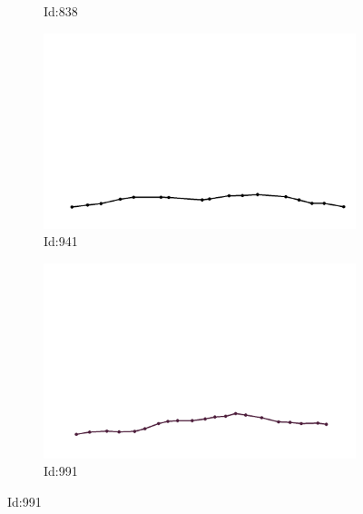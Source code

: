 \documentclass[12pt,twoside]{report}
\begin{document}
\begin{figure}
\begin{subfigure}[b]{0.20\textwidth}
\caption{Id:838}
\end{subfigure}
\begin{subfigure}[b]{0.20\textwidth}
\centering
\includegraphics[width=\textwidth]{../../trajectories/941.png}
\caption{Id:941}
\end{subfigure}
\begin{subfigure}[b]{0.20\textwidth}
\centering
\includegraphics[width=\textwidth]{../../trajectories/991.png}
\caption{Id:991}
\end{subfigure}
\end{figure}
\end{document}

